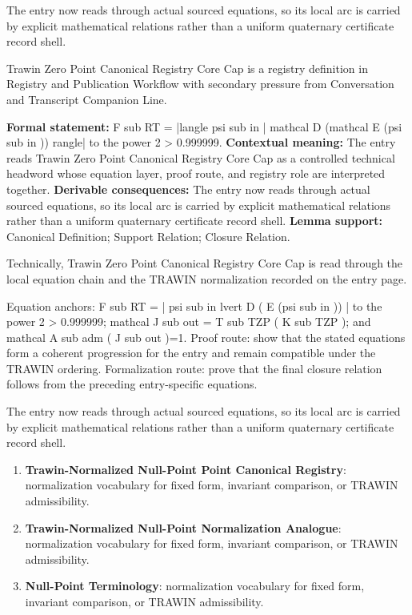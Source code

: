 The entry now reads through actual sourced equations, so its local arc is carried by explicit mathematical relations rather than a uniform quaternary certificate record shell.
\clearpage


\begingroup\small
{}
Trawin Zero Point Canonical Registry Core Cap is a registry definition in Registry and Publication Workflow with secondary pressure from Conversation and Transcript Companion Line.

\begingroup\footnotesize\setlength{\emergencystretch}{3em}\sloppy
\textbf{Formal statement:} F sub RT = |langle psi sub in | mathcal D (mathcal E (psi sub in )) rangle| to the power 2 > 0.999999. \textbf{Contextual meaning:} The entry reads Trawin Zero Point Canonical Registry Core Cap as a controlled technical headword whose equation layer, proof route, and registry role are interpreted together. \textbf{Derivable consequences:} The entry now reads through actual sourced equations, so its local arc is carried by explicit mathematical relations rather than a uniform quaternary certificate record shell. \textbf{Lemma support:} Canonical Definition; Support Relation; Closure Relation.\par
\endgroup

Technically, Trawin Zero Point Canonical Registry Core Cap is read through the local equation chain and the TRAWIN normalization recorded on the entry page.

Equation anchors: F sub RT = | psi sub in lvert D ( E (psi sub in )) | to the power 2 > 0.999999; mathcal J sub out = T sub TZP ( K sub TZP ); and mathcal A sub adm ( J sub out )=1. Proof route: show that the stated equations form a coherent progression for the entry and remain compatible under the TRAWIN ordering. Formalization route: prove that the final closure relation follows from the preceding entry-specific equations.

The entry now reads through actual sourced equations, so its local arc is carried by explicit mathematical relations rather than a uniform quaternary certificate record shell.
\endgroup

\begin{enumerate}[leftmargin=1.6em,itemsep=6pt,topsep=4pt]
\item \textbf{Trawin-Normalized Null-Point Point Canonical Registry}: normalization vocabulary for fixed form, invariant comparison, or TRAWIN admissibility.
\item \textbf{Trawin-Normalized Null-Point Normalization Analogue}: normalization vocabulary for fixed form, invariant comparison, or TRAWIN admissibility.
\item \textbf{Null-Point Terminology}: normalization vocabulary for fixed form, invariant comparison, or TRAWIN admissibility.
\end{enumerate}


